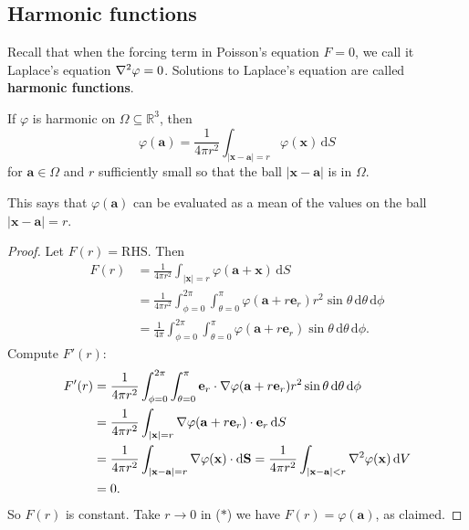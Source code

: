 \subsection{Harmonic functions}
\begin{definition}
    Recall that when the forcing term in Poisson's equation $ F=0 $, we call it Laplace's equation $ \laplacian \varphi=0 $. Solutions to Laplace's equation are called \textbf{harmonic functions}.
\end{definition}
\begin{proposition}
    If $ \varphi $ is harmonic on $ \Omega \subseteq \mathbb{R}^3 $, then 
    \[
        \varphi(\mathbf{a}) = \frac{1}{4\pi r^2} \int_{|\mathbf{x}-\mathbf{a}|=r} \varphi(\mathbf{x}) \,\mathrm{d}S
    \]
    for $ \mathbf{a}\in \Omega $ and $r$ sufficiently small so that the ball $ |\mathbf{x}-\mathbf{a}| $ is in $ \Omega $.
\end{proposition}
\begin{note}
    This says that $ \varphi(\mathbf{a}) $ can be evaluated as a mean of the values on the ball $ |\mathbf{x}-\mathbf{a}|=r $.
\end{note}
\begin{proof}
    Let $ F(r)=\text{RHS} $. Then 
    \begin{align}
        F(r) &= \frac{1}{4\pi r^2} \int_{|\mathbf{x}|=r} \varphi(\mathbf{a}+\mathbf{x}) \,\mathrm{d}S\nonumber\\ \nonumber
        &= \frac{1}{4\pi r^2} \int_{\phi=0}^{2\pi} \int_{\theta=0}^{\pi} \varphi(\mathbf{a}+r\mathbf{e}_r) r^2 \sin \theta \,\mathrm{d}\theta \,\mathrm{d}\phi\\ 
        &= \frac{1}{4\pi} \int_{\phi=0}^{2\pi} \int_{\theta=0}^{\pi} \varphi(\mathbf{a}+r\mathbf{e}_r) \sin \theta \,\mathrm{d}\theta \,\mathrm{d}\phi.\tag{$*$}
    \end{align}
    Compute $ F'(r) $: 
    \begin{align*}
        F'(r)&= \frac{1}{4\pi r^2}\int_{\phi=0}^{2\pi} \int_{\theta=0}^{\pi} \mathbf{e}_r \cdot \nabla \varphi(\mathbf{a}+r\mathbf{e}_r) r^2 \sin \theta \,\mathrm{d}\theta \,\mathrm{d}\phi\\ 
        &= \frac{1}{4\pi r^2} \int_{|\mathbf{x}|=r} \nabla \varphi(\mathbf{a}+r\mathbf{e}_r) \cdot \mathbf{e}_r \,\mathrm{d}S\\ 
        &= \frac{1}{4\pi r^2} \int_{|\mathbf{x}-\mathbf{a}|=r} \nabla \varphi(\mathbf{x})  \cdot \mathrm{d}\mathbf{S} = \frac{1}{4\pi r^2} \int_{|\mathbf{x}-\mathbf{a}|<r} \laplacian \varphi(\mathbf{x}) \,\mathrm{d}V\\ 
        & =0.
    \end{align*}
    So $F(r)$ is constant. Take $ r\to 0 $ in ($ * $) we have $ F(r)=\varphi(\mathbf{a}) $, as claimed.
\end{proof}

